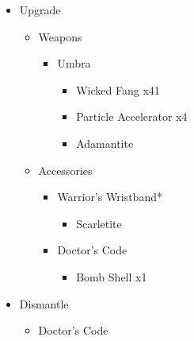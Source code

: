 \begin{upgrade}
	\begin{itemize}
		\item Upgrade
			\begin{itemize}
				\item Weapons
					\begin{itemize}
						\item Umbra
							\begin{itemize}
								\item Wicked Fang x41
								\item Particle Accelerator x4
								\item Adamantite
							\end{itemize}
					\end{itemize}
				\item Accessories
					\begin{itemize}
						\item Warrior's Wristband*
							\begin{itemize}
								\item Scarletite
							\end{itemize}
						\item Doctor's Code
							\begin{itemize}
								\item Bomb Shell x1
							\end{itemize}
					\end{itemize}
			\end{itemize}
		\item Dismantle
			\begin{itemize}
				\item Doctor's Code
			\end{itemize}
	\end{itemize}
\end{upgrade}
\vfill

